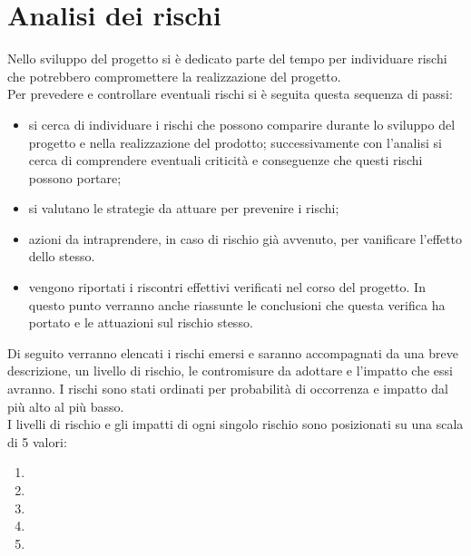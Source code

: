 \section{Analisi dei rischi}
Nello sviluppo del progetto si è dedicato parte del tempo per individuare rischi che potrebbero compromettere la realizzazione del progetto.\\
Per prevedere e controllare eventuali rischi si è seguita questa sequenza di passi:
\begin{itemize}
\item {} si cerca di individuare i rischi che possono comparire durante lo sviluppo del progetto e nella realizzazione del prodotto; successivamente con l'analisi si cerca di comprendere eventuali criticità e conseguenze che questi rischi possono portare;
\item {} si valutano le strategie da attuare  per prevenire i rischi;
\item {} azioni da intraprendere, in caso di rischio già avvenuto, per vanificare l'effetto dello stesso.
\item {} vengono riportati i riscontri effettivi verificati nel corso del progetto. In questo punto verranno anche riassunte le conclusioni che questa verifica ha portato e le attuazioni sul rischio stesso. 
\end{itemize}
Di seguito verranno elencati i rischi emersi e saranno accompagnati da una breve descrizione, un livello di rischio, le contromisure da adottare e l'impatto che essi avranno. I rischi sono stati ordinati per probabilità di occorrenza e impatto dal più alto al più basso.\\
I livelli di rischio e gli impatti di ogni singolo rischio sono posizionati su una scala di 5 valori:
\begin{enumerate}
\item {}
\item {}
\item {}
\item {}
\item {}
\end{enumerate}

